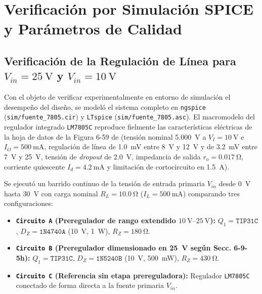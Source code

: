 \section{Verificación por Simulación SPICE y Parámetros de Calidad}
\label{sec:simulaciones}

\subsection{Verificación de la Regulación de Línea para $V_{in} = \SI{25}{\volt}$ y $V_{in} = \SI{10}{\volt}$}
Con el objeto de verificar experimentalmente en entorno de simulación el desempeño del diseño, se modeló el sistema completo en \texttt{ngspice} (\texttt{sim/fuente\_7805.cir}) y \texttt{LTspice} (\texttt{sim/fuente\_7805.asc}). El macromodelo del regulador integrado \texttt{LM7805C} reproduce fielmente las características eléctricas de la hoja de datos de la Figura 6-59 de \cite{gonzalez_p3} (tensión nominal \SI{5,000}{\volt} a $V_I = \SI{10}{\volt}$ e $I_O = \SI{500}{\milli\ampere}$, regulación de línea de \SI{1,0}{\milli\volt} entre \SI{8}{\volt} y \SI{12}{\volt} y de \SI{3,2}{\milli\volt} entre \SI{7}{\volt} y \SI{25}{\volt}, tensión de \emph{dropout} de \SI{2,0}{\volt}, impedancia de salida $r_o = \SI{0,017}{\ohm}$, corriente quiescente $I_d = \SI{4,2}{\milli\ampere}$ y limitación de cortocircuito en \SI{1,5}{\ampere}).

Se ejecutó un barrido continuo de la tensión de entrada primaria $V_{in}$ desde \SI{0}{\volt} hasta \SI{30}{\volt} con carga nominal $R_L = \SI{10,0}{\ohm}$ ($I_L = \SI{500}{\milli\ampere}$) comparando tres configuraciones:
\begin{itemize}
    \item \textbf{\texttt{Circuito A} (Preregulador de rango extendido $\SI{10}{\volt}\text{--}\SI{25}{\volt}$):} $Q_1 = \texttt{TIP31C}$, $D_Z = \texttt{1N4740A}$ (\SI{10}{\volt}, \SI{1}{\watt}), $R_Z = \SI{180}{\ohm}$.
    \item \textbf{\texttt{Circuito B} (Preregulador dimensionado en \SI{25}{\volt} según Secc. 6-9-5h):} $Q_1 = \texttt{TIP31C}$, $D_Z = \texttt{1N5240B}$ (\SI{10}{\volt}, \SI{500}{\milli\watt}), $R_Z = \SI{430}{\ohm}$.
    \item \textbf{\texttt{Circuito C} (Referencia sin etapa prereguladora):} Regulador \texttt{LM7805C} conectado de forma directa a la fuente primaria $V_{in}$.
\end{itemize}

